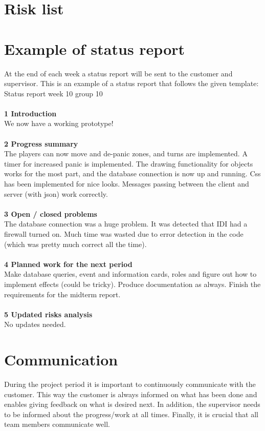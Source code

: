 \section{Risk list}


\section{Example of status report}
At the end of each week a status report will be sent to the customer and supervisor. This is an example of a status report that follows the given template: \\
\newline
Status report week 10 group 10\\
\\
\textbf{1 Introduction}\\
We now have a working prototype!\\
\\
\textbf{2 Progress summary}\\
The players can now move and de-panic zones, and turns are implemented. A timer for increased panic is implemented. The drawing functionality for objects works for the most part, and the database connection is now up and running. Css has been implemented for nice looks. Messages passing between the client and server (with json) work correctly.\\
\\
\textbf{3 Open / closed problems}\\
The database connection was a huge problem. It was detected that IDI had a firewall turned on. Much time was wasted due to error detection in the code (which was pretty much correct all the time).\\
\\
\textbf{4 Planned work for the next period}\\
Make database queries, event and information cards, roles and figure out how to implement effects (could be tricky). Produce documentation as always. Finish the requirements for the midterm report.\\
\\
\textbf{5 Updated risks analysis}\\
No updates needed.\\


\section{Communication}
During the project period it is important to continuously communicate with the customer. This way the customer is always informed on what has been done and enables giving feedback on what is desired next. In addition, the supervisor needs to be informed about the progress/work at all times. Finally, it is crucial that all team members communicate well.

